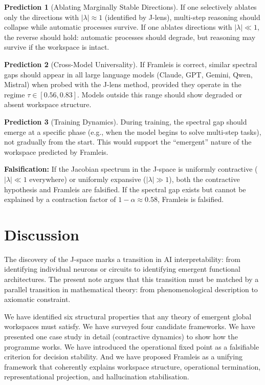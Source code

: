 \documentclass[11pt,a4paper]{article}
\theoremstyle{definition}
\newtheorem{prediction}{Prediction}
\begin{document}
\begin{prediction}[Ablating Marginally Stable Directions]
If one selectively ablates only the directions with $|\lambda| \approx 1$
(identified by J-lens), multi-step reasoning should collapse while automatic
processes survive. If one ablates directions with $|\lambda| \ll 1$, the
reverse should hold: automatic processes should degrade, but reasoning may
survive if the workspace is intact.
\end{prediction}

\begin{prediction}[Cross-Model Universality]
If Framleis is correct, similar spectral gaps should appear in all large language
models (Claude, GPT, Gemini, Qwen, Mistral) when probed with the J-lens method,
provided they operate in the regime $\tau \in [0.56, 0.83]$. Models outside this
range should show degraded or absent workspace structure.
\end{prediction}

\begin{prediction}[Training Dynamics]
During training, the spectral gap should emerge at a specific phase (e.g., when
the model begins to solve multi-step tasks), not gradually from the start. This
would support the ``emergent'' nature of the workspace predicted by Framleis.
\end{prediction}

\textbf{Falsification:} If the Jacobian spectrum in the J-space is uniformly
contractive ($|\lambda| \ll 1$ everywhere) or uniformly expansive
($|\lambda| \gg 1$), both the contractive hypothesis and Framleis are falsified.
If the spectral gap exists but cannot be explained by a contraction factor
of $1 - \alpha \approx 0.58$, Framleis is falsified.

\section{Discussion}
\label{sec:discussion}

The discovery of the J-space marks a transition in AI interpretability: from
identifying individual neurons or circuits to identifying emergent functional
architectures. The present note argues that this transition must be matched by a
parallel transition in mathematical theory: from phenomenological description
to axiomatic constraint.

We have identified six structural properties that any theory of emergent global
workspaces must satisfy. We have surveyed four candidate frameworks. We have
presented one case study in detail (contractive dynamics) to show how the
programme works. We have introduced the operational fixed point as a falsifiable
criterion for decision stability. And we have proposed Framleis as a unifying
framework that coherently explains workspace structure, operational termination,
representational projection, and hallucination stabilisation.
\end{document}
